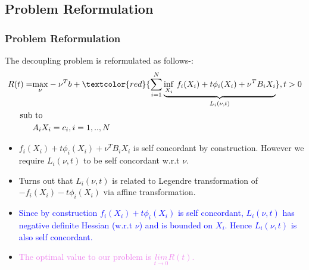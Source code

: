 \documentclass{beamer}
\newcommand\FontviTen{\fontsize{10}{7.2}\selectfont}
\begin{document}
\subsection{Problem Reformulation}
\begin{frame}
\frametitle{Problem Reformulation}
\FontviTen
The decoupling problem is reformulated as follows-:
\begin{align*}
R(t) = &\underset{\nu}{\mathrm{max}}-{\nu}^{T}b + \textcolor{red}{\sum_{i=1}^{N} \underbrace{\underset{X_i}{\mathrm{inf}} \,\,f_{i}(X_i) + t\phi_i(X_i) + {\nu}^{T} B_i X_i}_{L_{i}(\nu,t)}} , t > 0  \\
\text{sub} & \text{ to} \\
&A_i X_i = c_i , i = 1,..,N 
\end{align*}
\begin{itemize}
\item $f_{i}(X_i) + t\phi_i(X_i) + {\nu}^{T} B_i X_i$ is self concordant by construction. However we require $L_i(\nu,t)$ to be self concordant w.r.t $\nu$. 
\item Turns out that $L_i(\nu,t)$ is related to Legendre transformation of $-f_{i}(X_i) - t\phi_i(X_i)$ via affine transformation.
\item \textcolor{blue}{Since by construction $f_{i}(X_i) + t\phi_i(X_i)$ is self concordant, $L_i(\nu,t)$ has negative definite Hessian (w.r.t $\nu$) and is bounded on $X_i$. Hence $L_i(\nu , t)$ is also self concordant.}  
\item \textcolor{violet}{The optimal value to our problem is $\underset{t \rightarrow 0}{lim} R(t)$.}
\end{itemize}
\end{frame}
\end{document}
